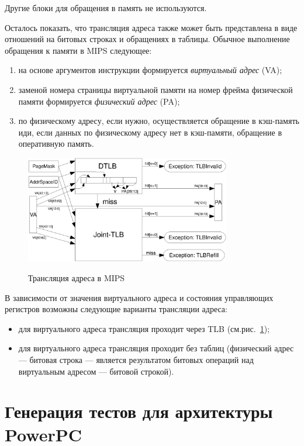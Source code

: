 Другие блоки для обращения в память не используются.

Осталось показать, что трансляция адреса также может быть представлена в виде
отношений на битовых строках и обращениях в таблицы. Обычное выполнение
обращения к памяти в MIPS следующее:
\begin{enumerate}
    \item на основе аргументов инструкции формируется \emph{виртуальный адрес}
(VA);
    \item заменой номера страницы виртуальной памяти на номер фрейма физической
памяти формируется \emph{физический адрес} (PA);
    \item по физическому адресу, если нужно, осуществляется обращение в
кэш-память иди, если данных по физическому адресу нет в кэш-памяти, обращение в
оперативную память.
\end{enumerate}

\begin{figure}[h] \center
  \includegraphics[width=0.8\textwidth]{4.analysis/mips_addrtrans}\\
  \caption{Трансляция адреса в MIPS}\label{fig:mips_address_translation}
\end{figure}


В зависимости от значения виртуального адреса и состояния управляющих регистров
возможны следующие варианты трансляции адреса:
\begin{itemize}
  \item для виртуального адреса трансляция проходит через TLB
(см.рис.~\ref{fig:mips_address_translation});
  \item для виртуального адреса трансляция проходит без таблиц (физический адрес
--- битовая строка --- является результатом битовых операций над виртуальным
адресом --- битовой строкой).
\end{itemize}

\section{Генерация тестов для архитектуры PowerPC}

